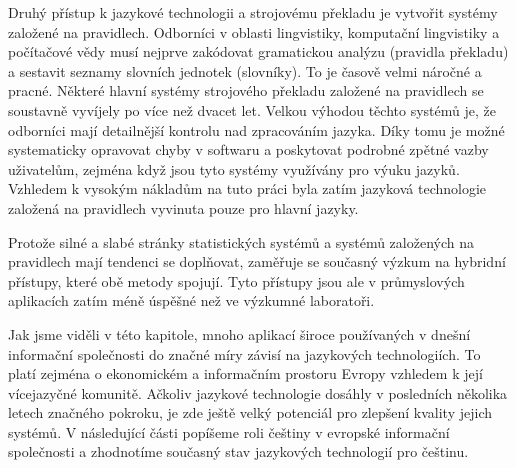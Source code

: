 \begin{multicols}{2}
Druhý přístup k jazykové technologii a strojovému překladu je vytvořit systémy založené na pravidlech. Odborníci v oblasti lingvistiky, komputační lingvistiky a počítačové vědy musí nejprve zakódovat gramatickou analýzu (pravidla překladu) a sestavit seznamy slovních jednotek (slovníky). To je časově velmi náročné a pracné. Některé hlavní systémy strojového překladu založené na pravidlech se soustavně vyvíjely po více než dvacet let. Velkou výhodou těchto systémů je, že odborníci mají detailnější kontrolu nad zpracováním jazyka. Díky tomu je možné systematicky opravovat chyby v softwaru a poskytovat podrobné zpětné vazby uživatelům, zejména když jsou tyto systémy využívány pro výuku jazyků. Vzhledem k vysokým nákladům na tuto práci byla zatím jazyková technologie založená na pravidlech vyvinuta pouze pro hlavní jazyky.

Protože silné a slabé stránky statistických systémů a systémů založených na pravidlech mají tendenci se doplňovat, zaměřuje se současný výzkum na hybridní přístupy, které obě metody spojují. Tyto přístupy jsou ale v průmyslových aplikacích zatím méně úspěšné než ve výzkumné laboratoři.

Jak jsme viděli v této kapitole, mnoho aplikací široce používaných v dnešní informační společnosti do značné míry závisí na jazykových technologiích. To platí zejména o ekonomickém a informačním prostoru Evropy vzhledem k její vícejazyčné komunitě. Ačkoliv jazykové technologie dosáhly v posledních několika letech značného pokroku, je zde ještě velký potenciál pro zlepšení kvality jejich systémů. V následující části popíšeme roli češtiny v evropské informační společnosti a zhodnotíme současný stav jazykových technologií pro češtinu.
\end{multicols}
\clearpage


